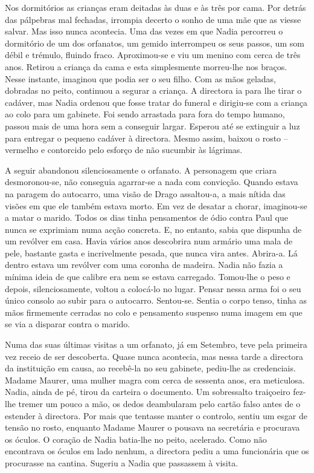 Nos dormitórios as crianças eram deitadas às duas e às três por cama.
Por detrás das pálpebras mal fechadas, irrompia decerto o sonho de uma
mãe que as viesse salvar. Mas isso nunca acontecia. Uma das vezes em que
Nadia percorreu o dormitório de um dos orfanatos, um gemido interrompeu
os seus passos, um som débil e trémulo, fluindo fraco. Aproximou-se e
viu um menino com cerca de três anos. Retirou a criança da cama e esta
simplesmente morreu-lhe nos braços. Nesse instante, imaginou que podia
ser o seu filho. Com as mãos geladas, dobradas no peito, continuou a
segurar a criança. A directora ia para lhe tirar o cadáver, mas Nadia
ordenou que fosse tratar do funeral e dirigiu-se com a criança ao colo
para um gabinete. Foi sendo arrastada para fora do tempo humano,
passou mais de uma hora sem a conseguir largar. Esperou até se extinguir
a luz para entregar o pequeno cadáver à directora. Mesmo assim, baixou o
rosto -- vermelho e contorcido pelo esforço de não sucumbir às lágrimas.

A seguir abandonou silenciosamente o orfanato. A personagem que criara desmoronou-se, não conseguia agarrar-se a nada com
convicção. Quando estava na paragem do autocarro, uma visão de Drago
assaltou-a, a mais
nítida das visões em que ele também estava morto. Em vez de desatar a
chorar, imaginou-se a matar o marido. Todos os dias tinha pensamentos de
ódio contra Paul que nunca se exprimiam numa acção concreta. E, no
entanto, sabia que dispunha de um revólver em casa. Havia vários anos
descobrira num armário uma mala de pele, bastante gasta e incrivelmente
pesada, que nunca vira antes. Abrira-a. Lá dentro estava um revólver com
uma coronha de madeira. Nadia não fazia a mínima ideia de que calibre
era nem se estava carregado. Tomou-lhe o peso e depois, silenciosamente, voltou a colocá-lo no lugar. Pensar nessa arma foi o seu único
consolo ao subir para o autocarro. Sentou-se. Sentia o corpo tenso,
tinha as mãos firmemente cerradas no colo e pensamento suspenso numa
imagem em que se via a disparar contra o marido.

Numa das suas últimas visitas a um orfanato, já em
Setembro, teve pela primeira vez receio de ser descoberta. Quase nunca
acontecia, mas nessa tarde a directora da instituição em causa, ao
recebê-la no seu gabinete, pediu-lhe as credenciais. Madame Maurer, uma
mulher magra com cerca de sessenta anos, era meticulosa. Nadia, ainda de
pé, tirou da carteira o documento. Um sobressalto traiçoeiro fez-lhe
tremer um pouco a mão, os dedos deambularam pelo cartão falso antes de o
estender à directora. Por mais que tentasse manter o controlo, sentiu um
esgar de tensão no rosto, enquanto Madame Maurer o pousava na secretária e procurava os óculos. O coração de Nadia batia-lhe no peito,
acelerado. Como não encontrava os óculos em lado nenhum, a directora
pediu a uma funcionária que os procurasse na cantina. Sugeriu a Nadia
que passassem à visita.

